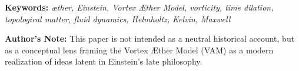 \documentclass[a4paper,12pt]{article}
\begin{document}
\begin{titlepage}
\begin{abstract}
        \end{abstract}

        \vspace{1em}
        \noindent\textbf{Keywords:} \textit{æther, Einstein, Vortex Æther Model, vorticity, time dilation, topological matter, fluid dynamics, Helmholtz, Kelvin, Maxwell}

        \vspace{2em}
        \noindent\textbf{Author's Note:} This paper is not intended as a neutral historical account, but as a conceptual lens framing the Vortex Æther Model (VAM) as a modern realization of ideas latent in Einstein's late philosophy.

    \end{titlepage}

    \newpage


    
    
    

    \appendix \label{sec:Appendix}
        
        
        

    
    
\end{document}
